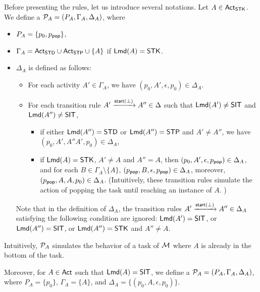 Before presenting the rules, let us introduce several notations. Let $A \in {\sf Act}_{\sf STK}$. 
We define a {\PDS} ${\mathcal{P} }_{A} = (P_A, \Gamma_{A}, \Delta_{A})$, where 
\begin{itemize}
\item $P_A = \{p_0, p_{\mathsf{pop}}\}$, 
\item $\Gamma_{A} = {\sf Act}_{{\sf STD}} \cup {\sf Act}_{{\sf STP}} \cup \{A\}$ if ${\sf Lmd}(A) = {\sf STK}$.
\item $\Delta_{A}$ is defined as follows: 
\begin{itemize}
%
\item For each activity $A' \in \Gamma_A $, we have $(p_0, A', \epsilon, p_0) \in \Delta_{A}$.
%
\item For each transition rule $A' \xrightarrow{{\mathsf{start} }(\bot)} A'' \in \Delta$ such that ${\sf Lmd}(A') \neq {\sf SIT}$ and ${\sf Lmd}(A'') \neq  {\sf SIT}$, 
\begin{itemize}
    \item if either ${\sf Lmd}(A'') = \mathsf{STD}$ or ${\sf Lmd}(A'') = {\sf STP}$ and $A' \neq A''$, we have $(p_0, A', A''A', p_0) \in \Delta_{A}$,    
    \item if ${\sf Lmd}(A) = {\sf STK}$, $A' \neq A$ and $A'' = A$, then $(p_0, A', \epsilon, p_{\mathsf{pop}}) \in \Delta_{A}$, and for each $B \in \Gamma_{A} \setminus \{A\}$, $(p_{\mathsf{pop}}, B, \epsilon, p_{\mathsf{pop}}) \in \Delta_{A}$, moreover, $(p_{\mathsf{pop}}, A, A, p_0) \in \Delta_{A}$. (Intuitively, these transition rules simulate the action of popping the task until reaching an instance of $A$. )
\end{itemize}
\end{itemize}
Note that in the definition of $\Delta_{A}$, the transition rules $A' \xrightarrow{{\mathsf{start} }(\bot)} A'' \in \Delta_A$ satisfying the following condition are ignored: ${\sf Lmd}(A') = {\sf SIT}$, or ${\sf Lmd}(A'') = {\sf SIT}$, or ${\sf Lmd}(A'') = {\sf STK}$ and $A'' \neq A$. 
\end{itemize}
Intuitively, ${\mathcal{P} }_{A}$ simulates the behavior of a task of ${\mathcal{M} }$ where $A$ is already in the bottom of the task. 

Moreover, for $A \in {\sf Act}$ such that ${\sf Lmd}(A) = {\sf SIT}$, we define a {\PDS} ${\mathcal{P} }_A  = (P_A, \Gamma_A, \Delta_A)$, where $P_A = \{p_0\}$, $\Gamma_A = \{A\}$, and $\Delta_A = \{(p_0, A, \epsilon, p_0)\}$.



